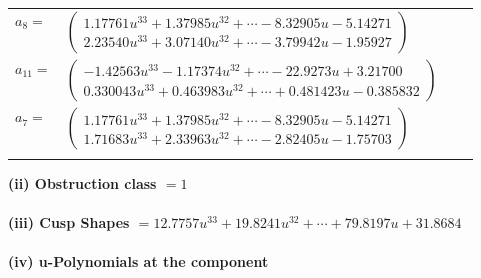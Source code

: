\documentclass[1p]{elsarticle_modified}
\theoremstyle{definition}
\begin{document}
\begin{tabular}{m{7pt} m{180pt} m{7pt} m{180pt} }
\flushright $a_{8}=$&$\begin{pmatrix}1.17761 u^{33}+1.37985 u^{32}+\cdots-8.32905 u-5.14271\\2.23540 u^{33}+3.07140 u^{32}+\cdots-3.79942 u-1.95927\end{pmatrix}$ \\
\flushright $a_{11}=$&$\begin{pmatrix}-1.42563 u^{33}-1.17374 u^{32}+\cdots-22.9273 u+3.21700\\0.330043 u^{33}+0.463983 u^{32}+\cdots+0.481423 u-0.385832\end{pmatrix}$ \\
\flushright $a_{7}=$&$\begin{pmatrix}1.17761 u^{33}+1.37985 u^{32}+\cdots-8.32905 u-5.14271\\1.71683 u^{33}+2.33963 u^{32}+\cdots-2.82405 u-1.75703\end{pmatrix}$\\&\end{tabular}
\flushleft \textbf{(ii) Obstruction class $= 1$}\\~\\
\flushleft \textbf{(iii) Cusp Shapes $= 12.7757 u^{33}+19.8241 u^{32}+\cdots+79.8197 u+31.8684$}\\~\\
\newpage\renewcommand{\arraystretch}{1}
\flushleft \textbf{(iv) u-Polynomials at the component}\newline \\
\end{document}
